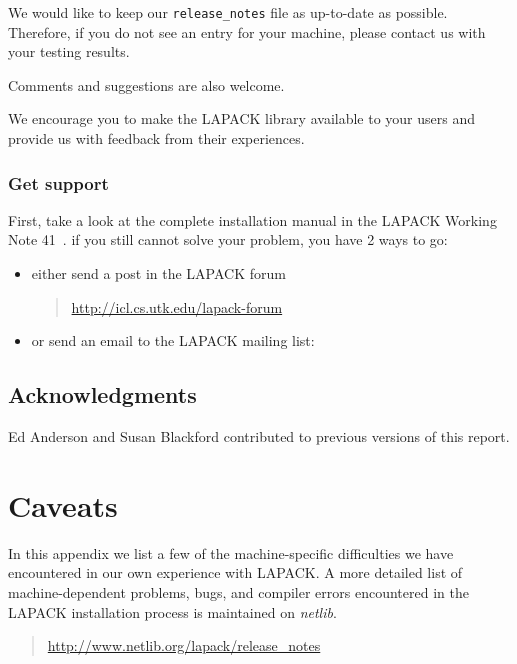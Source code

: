 \documentclass[11pt]{report}
\begin{document}
We would like to keep our \texttt{release\_notes} file as up-to-date as possible.
Therefore, if you do not see an entry for your machine, please contact us
with your testing results.
 
Comments and suggestions are also welcome.

We encourage you to make the LAPACK library available to your
users and provide us with feedback from their experiences.

\subsection{Get support}\label{getsupport}
First, take a look at the complete installation manual in the LAPACK Working Note 41~\cite{WN41}. 
if you still cannot solve your problem, you have 2 ways to go:
\begin{itemize}
\item
either send a post in the LAPACK forum 
\begin{quote}
\url{http://icl.cs.utk.edu/lapack-forum}
\end{quote}
\item
or send an email to the LAPACK mailing list: 
\end{itemize}
\section*{Acknowledgments}

Ed Anderson and Susan Blackford contributed to previous versions of this report.

\appendix

\chapter{Caveats}\label{appendixd}

In this appendix we list a few of the machine-specific difficulties we
have
encountered in our own experience with LAPACK.  A more detailed list
of machine-dependent problems, bugs, and compiler errors encountered
in the LAPACK installation process is maintained
on \emph{netlib}.
\begin{quote}
\url{http://www.netlib.org/lapack/release\_notes}
\end{quote}
\end{document}
